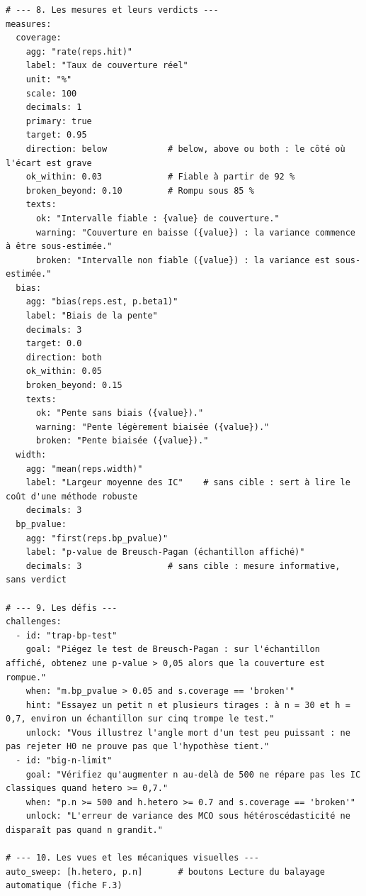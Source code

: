 \documentclass[11pt,a4paper]{article}
\begin{document}
\begin{appendices}
\begin{lstlisting}[caption={Fichier de référence \texttt{experiments/regression\_lineaire.yaml}.}]
# --- 8. Les mesures et leurs verdicts ---
measures:
  coverage:
    agg: "rate(reps.hit)"
    label: "Taux de couverture réel"
    unit: "%"
    scale: 100
    decimals: 1
    primary: true
    target: 0.95
    direction: below            # below, above ou both : le côté où l'écart est grave
    ok_within: 0.03             # Fiable à partir de 92 %
    broken_beyond: 0.10         # Rompu sous 85 %
    texts:
      ok: "Intervalle fiable : {value} de couverture."
      warning: "Couverture en baisse ({value}) : la variance commence à être sous-estimée."
      broken: "Intervalle non fiable ({value}) : la variance est sous-estimée."
  bias:
    agg: "bias(reps.est, p.beta1)"
    label: "Biais de la pente"
    decimals: 3
    target: 0.0
    direction: both
    ok_within: 0.05
    broken_beyond: 0.15
    texts:
      ok: "Pente sans biais ({value})."
      warning: "Pente légèrement biaisée ({value})."
      broken: "Pente biaisée ({value})."
  width:
    agg: "mean(reps.width)"
    label: "Largeur moyenne des IC"    # sans cible : sert à lire le coût d'une méthode robuste
    decimals: 3
  bp_pvalue:
    agg: "first(reps.bp_pvalue)"
    label: "p-value de Breusch-Pagan (échantillon affiché)"
    decimals: 3                 # sans cible : mesure informative, sans verdict

# --- 9. Les défis ---
challenges:
  - id: "trap-bp-test"
    goal: "Piégez le test de Breusch-Pagan : sur l'échantillon affiché, obtenez une p-value > 0,05 alors que la couverture est rompue."
    when: "m.bp_pvalue > 0.05 and s.coverage == 'broken'"
    hint: "Essayez un petit n et plusieurs tirages : à n = 30 et h = 0,7, environ un échantillon sur cinq trompe le test."
    unlock: "Vous illustrez l'angle mort d'un test peu puissant : ne pas rejeter H0 ne prouve pas que l'hypothèse tient."
  - id: "big-n-limit"
    goal: "Vérifiez qu'augmenter n au-delà de 500 ne répare pas les IC classiques quand hetero >= 0,7."
    when: "p.n >= 500 and h.hetero >= 0.7 and s.coverage == 'broken'"
    unlock: "L'erreur de variance des MCO sous hétéroscédasticité ne disparaît pas quand n grandit."

# --- 10. Les vues et les mécaniques visuelles ---
auto_sweep: [h.hetero, p.n]       # boutons Lecture du balayage automatique (fiche F.3)


\end{lstlisting}
\end{appendices}
\end{document}
